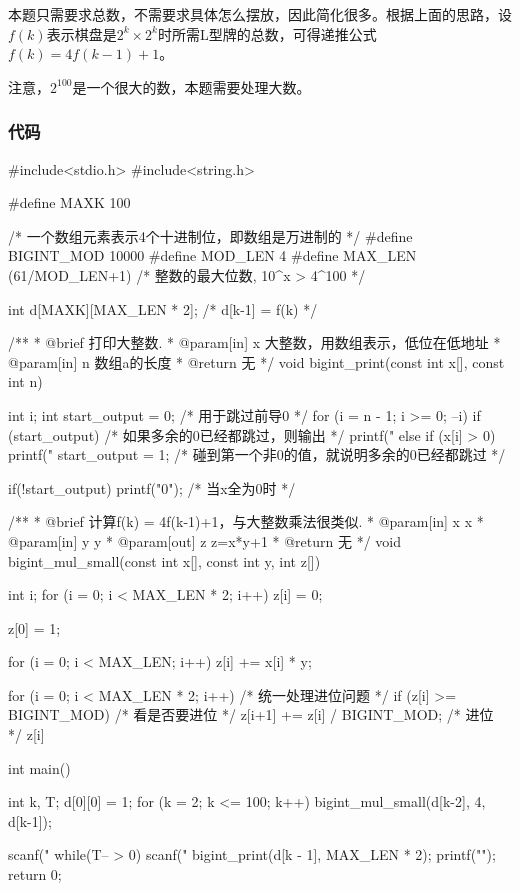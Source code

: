本题只需要求总数，不需要求具体怎么摆放，因此简化很多。根据上面的思路，设$f(k)$表示棋盘是$2^k \times 2^k$时所需L型牌的总数，可得递推公式$f(k)=4f(k-1)+1$。

注意，$2^100$是一个很大的数，本题需要处理大数。

\subsubsection{代码}
\begin{Codex}[label=chessboard_cover.c]
#include<stdio.h>
#include<string.h>

#define MAXK 100

/* 一个数组元素表示4个十进制位，即数组是万进制的 */
#define BIGINT_MOD 10000
#define MOD_LEN 4
#define MAX_LEN (61/MOD_LEN+1)  /* 整数的最大位数, 10^x > 4^100 */

int  d[MAXK][MAX_LEN * 2];  /* d[k-1] = f(k) */

/**
 * @brief 打印大整数.
 * @param[in] x 大整数，用数组表示，低位在低地址
 * @param[in] n 数组a的长度
 * @return 无
 */
void bigint_print(const int x[], const int n) {
    int i;
    int start_output = 0;  /* 用于跳过前导0 */
    for (i = n - 1; i >= 0; --i) {
        if (start_output) {  /* 如果多余的0已经都跳过，则输出 */
            printf("%
        } else if (x[i] > 0) {
            printf("%
            start_output = 1; /* 碰到第一个非0的值，就说明多余的0已经都跳过 */
        }
    }

    if(!start_output) printf("0");  /* 当x全为0时 */
}

/**
 * @brief 计算f(k) = 4f(k-1)+1，与大整数乘法很类似.
 * @param[in] x x
 * @param[in] y y
 * @param[out] z z=x*y+1
 * @return 无
 */
void bigint_mul_small(const int x[], const int y, int z[]) {
    int i;
    for (i = 0; i < MAX_LEN * 2; i++) z[i] = 0;

    z[0] = 1;

    for (i = 0; i < MAX_LEN; i++) z[i] += x[i] * y;
    
    for (i = 0; i < MAX_LEN * 2; i++) {  /* 统一处理进位问题 */
        if (z[i] >= BIGINT_MOD) {  /* 看是否要进位 */
            z[i+1] += z[i] / BIGINT_MOD;  /* 进位 */
            z[i] %
        }
    }
}

int main() {
    int k, T;
    d[0][0] = 1;
    for (k = 2; k <= 100; k++) bigint_mul_small(d[k-2], 4, d[k-1]);

    scanf("%
    while(T-- > 0) {
        scanf("%
        bigint_print(d[k - 1], MAX_LEN * 2);
        printf("\n");
    }
    return 0;
}
\end{Codex}

